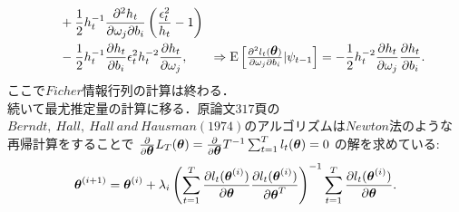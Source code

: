 \documentclass[8pt]{jsarticle}
\def\vector#1{\mbox{\boldmath $#1$}}
\def\Exp#1{\mbox{${\rm E} \left[ #1 \right]$}}
\begin{document}
\begin{breakbox}
\begin{align*}
				&\quad+ \frac{1}{2} h_t^{-1} \frac{\partial^2 h_t}{\partial \omega_j \partial b_i} \left( \frac{\epsilon_t^2}{h_t} - 1 \right) \\
				&\quad- \frac{1}{2} h_t^{-1} \frac{\partial h_t}{\partial b_i} \epsilon_t^2 h_t^{-2} \frac{\partial h_t}{\partial \omega_j},
			\hspace{20pt} \Rightarrow \Exp{\frac{\partial^2 l_t(\vector{\theta})}{\partial \omega_j \partial b_i} | \psi_{t-1}} = -\frac{1}{2} h_t^{-2} \frac{\partial h_t}{\partial \omega_j} \frac{\partial h_t}{\partial b_i}.
	\end{align*}
	ここで$Ficher$情報行列の計算は終わる．\\
	続いて最尤推定量の計算に移る．原論文$317$頁の$Berndt,\ Hall,\ Hall\ and\ Hausman(1974)$のアルゴリズムは$Newton$法のような再帰計算をすることで
	$\frac{\partial}{\partial \vector{\theta}}L_T(\vector{\theta}) = \frac{\partial}{\partial \vector{\theta}}T^{-1} \sum_{t=1}^{T} l_t(\vector{\theta}) = 0$
	の解を求めている:
	\[
		\vector{\theta}^{(i+1)} = \vector{\theta}^{(i)} + \lambda_i \left( 
			\sum_{t=1}^{T} \frac{\partial l_t(\vector{\theta}^{(i)})}{\partial \vector{\theta}} \frac{\partial l_t(\vector{\theta}^{(i)})}{\partial \vector{\theta}^{T}} 
			\right)^{-1} \sum_{t=1}^{T} \frac{\partial l_t(\vector{\theta}^{(i)})}{\partial \vector{\theta}}.
	\]
\end{breakbox}
\end{document}
